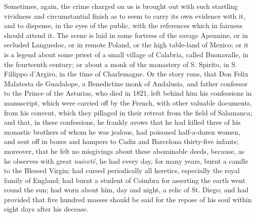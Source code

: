 Sometimes, again, the crime charged on us is brought
out with such startling vividness and circumstantial
finish as to seem to carry its own evidence with it, and
to dispense, in the eyes of the public, with the
references which in fairness should attend it. The scene
is laid in some fortress of the savage Apennine, or in
secluded Languedoc, or in remote Poland, or the high
table-land of Mexico; or it is a legend about some priest
of a small village of Calabria, called Buonavalle, in the
fourteenth century; or about a monk of the monastery of
S. Spirito, in S. Fillippo d'Argiro, in the time of
Charlemagne. Or the story runs, that Don Felix Malatesta
de Guadalope, a Benedictine monk of Andalusia, and father
confessor to the Prince of the Asturias, who died in
1821, left behind him his confessions in manuscript,
which were carried off by the French, with other valuable
documents, from his convent, which they pillaged in their
retreat from the field of Salamanca; and that, in these
confessions, he frankly avows that he had killed three of
his monastic brothers of whom he was jealous, had
poisoned half-a-dozen women, and sent off in boxes and
hampers to Cadiz and Barcelona thirty-five infants;
moreover, that he felt no misgivings about these
abominable deeds, because, as he observes with great \emph{naiveté},
he had every day, for many years, burnt a candle to the
Blessed Virgin; had cursed periodically all heretics,
especially the royal family of England; had burnt a
student of Coimbra for asserting the earth went round the
sun; had worn about him, day and night, a relic of St.
Diego; and had provided that five hundred masses should
be said for the repose of his soul within eight days
after his decease.

